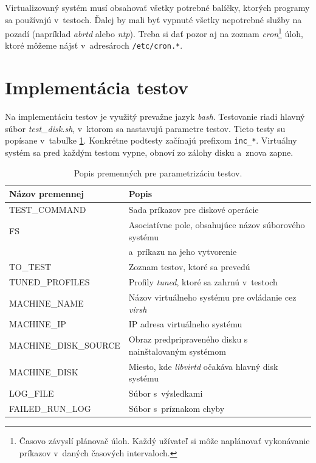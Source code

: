 Virtualizovaný systém musí obsahovať všetky potrebné balíčky, ktorých programy
sa používajú v~testoch. Ďalej by mali byť vypnuté všetky nepotrebné služby na
pozadí (napríklad \emph{abrtd} alebo \emph{ntp}). Treba si dať pozor aj na
zoznam \emph{cron}\footnote{Časovo závyslí plánovač úloh. Každý užívateľ si
môže naplánovať vykonávanie príkazov v~daných časových intervaloch.} úloh,
ktoré môžeme nájsť v~adresároch \texttt{/etc/cron.*}.

%
%

\section{Implementácia testov}

Na implementáciu testov je využitý prevažne jazyk \emph{bash}. Testovanie riadi
hlavný súbor \emph{test\_disk.sh}, v~ktorom sa nastavujú parametre testov.
Tieto testy su popísane v~tabuľke \ref{tab:test-params}. Konkrétne podtesty
začínajú prefixom \texttt{inc\_*}. Virtuálny systém sa pred každým testom
vypne, obnoví zo zálohy disku a~znova zapne.

\begin{table}[H]
\begin{center}
\begin{tabular}{|l|l|}
    \hline
    \textbf{Názov premennej} & \textbf{Popis} \\
    \hline
    TEST\_COMMAND           & Sada príkazov pre diskové operácie \\
    FS                      & Asociatívne pole, obsahujúce názov súborového systému \\
                            & a~príkazu na jeho vytvorenie \\
    TO\_TEST                & Zoznam testov, ktoré sa prevedú \\
    TUNED\_PROFILES         & Profily \emph{tuned}, ktoré sa zahrnú v~testoch \\
    MACHINE\_NAME           & Názov virtuálneho systému pre ovládanie cez \emph{virsh} \\
    MACHINE\_IP             & IP adresa virtuálneho systému \\
    MACHINE\_DISK\_SOURCE   & Obraz predpripraveného disku s nainštalovaným systémom \\
    MACHINE\_DISK           & Miesto, kde \emph{libvirtd} očakáva hlavný disk systému \\
    LOG\_FILE               & Súbor s~výsledkami \\
    FAILED\_RUN\_LOG        & Súbor s~príznakom chyby \\
    \hline
\end{tabular}
\caption{Popis premenných pre parametrizáciu testov.}
\label{tab:test-params}
\end{center}
\end{table}

